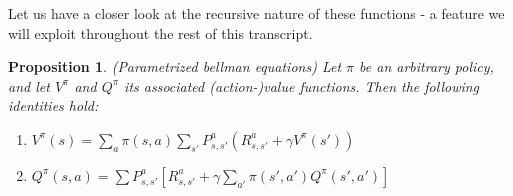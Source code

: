 \documentclass[11pt]{article} %
\newtheorem{prop}{Proposition}
\begin{document}
\newpage

Let us have a closer look at the recursive nature of these functions - a feature we will exploit throughout the rest of this transcript.

\begin{prop}{(Parametrized bellman equations)}
	Let $\pi$ be an arbitrary policy, and let $V^{\pi}$ and $Q^{\pi}$ its associated (action-)value functions. Then the following identities hold:
	\begin{enumerate}
		\item $V^{\pi}(s) = \sum_{a} \pi(s,a) \sum_{s'} P_{s,s'}^a ( R_{s,s'}^a + \gamma V^{\pi}(s') ) $
		\item $Q^{\pi}(s,a) = \sum P_{s,s'}^a [ R_{s,s'}^a + \gamma \sum_{a'} \pi(s',a') Q^{\pi}(s',a') ] $
	\end{enumerate}
\end{prop}
\end{document}
